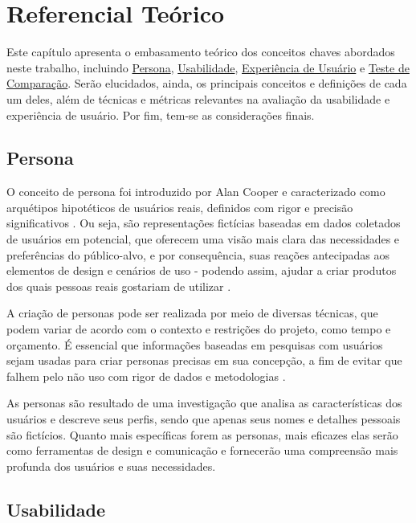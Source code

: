 \chapter[Referencial Teórico]{Referencial Teórico}

Este capítulo apresenta o embasamento teórico dos conceitos chaves abordados
neste trabalho, incluindo \hyperref[sec:Persona]{Persona}, \hyperref[sec:Usabilidade]
{Usabilidade}, \hyperref[sec:Experiência de Usuário]{Experiência de Usuário} e 
\hyperref[sec:Teste de Comparação]{Teste de Comparação}. 
Serão elucidados, ainda, os principais conceitos e definições de cada um deles, além de 
técnicas e métricas relevantes na avaliação da usabilidade e experiência de usuário. Por 
fim, tem-se as considerações finais.

\section{Persona}
\label{sec:Persona}

O conceito de persona foi introduzido por Alan Cooper e caracterizado como 
arquétipos hipotéticos de usuários reais, definidos com rigor e precisão 
significativos \cite{cooper1999}. Ou seja, são representações fictícias 
baseadas em dados coletados de usuários em potencial, que oferecem uma visão 
mais clara das necessidades e preferências do público-alvo, e por consequência, 
suas reações antecipadas aos elementos de design e cenários de uso - podendo 
assim, ajudar a criar produtos dos quais pessoas reais gostariam de utilizar 
\cite{pruitt2006}.

A criação de personas pode ser realizada por meio de diversas técnicas, que 
podem variar de acordo com o contexto e restrições do projeto, como tempo e 
orçamento. É essencial que informações baseadas em pesquisas com usuários sejam 
usadas para criar personas precisas em sua concepção, a fim de evitar que falhem 
pelo não uso com rigor de dados e metodologias \cite{pruitt2006}.

As personas são resultado de uma investigação que analisa as características dos 
usuários e descreve seus perfis, sendo que apenas seus nomes e detalhes pessoais 
são fictícios. Quanto mais específicas forem as personas, mais eficazes elas serão 
como ferramentas de design e comunicação e fornecerão uma compreensão mais profunda 
dos usuários e suas necessidades. \cite{barbosa2010}

\section{Usabilidade}
\label{sec:Usabilidade}

